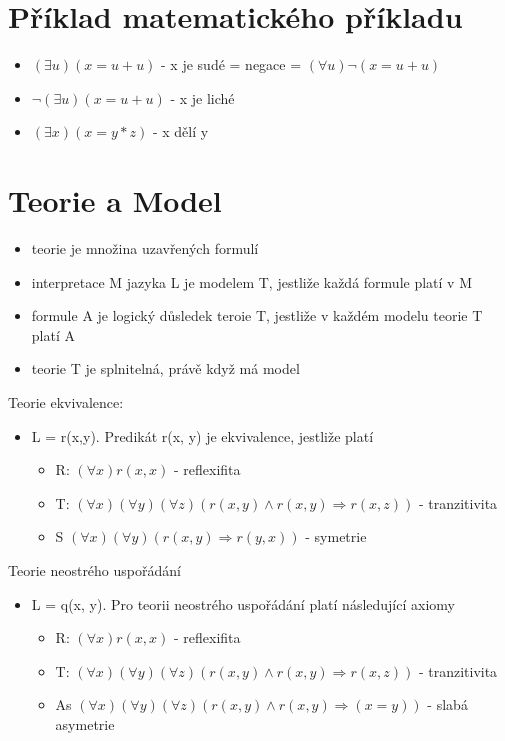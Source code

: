 \documentclass{szzclass}
\begin{document}
\section{Příklad matematického příkladu}
\begin{itemize}
  \item $(\exists{u})(x = u + u)$ - x je sudé = negace = $(\forall{u})\neg(x = u + u)$
  \item $\neg(\exists{u})(x = u + u)$ - x je liché
  \item $(\exists{x})(x = y*z)$ - x dělí y
\end{itemize}
\section{Teorie a Model}
\begin{itemize}
  \item teorie je množina uzavřených formulí
  \item interpretace M jazyka L je modelem T, jestliže každá formule platí v M
  \item formule A je logický důsledek teroie T, jestliže v každém modelu teorie T platí A
  \item teorie T je splnitelná, právě když má model
\end{itemize}
Teorie ekvivalence:
\begin{itemize}
  \item L = {r(x,y)}. Predikát r(x, y) je ekvivalence, jestliže platí
  \begin{itemize}
    \item R: $(\forall{x}) r(x,x)$ - reflexifita
    \item T: $(\forall{x})(\forall{y})(\forall{z})(r(x,y) \wedge r(x,y) \Rightarrow r(x,z))$ - tranzitivita
    \item S $(\forall{x})(\forall{y})(r(x,y) \Rightarrow r(y,x))$ - symetrie
  \end{itemize}
\end{itemize}
Teorie neostrého uspořádání
\begin{itemize}
  \item L = {q(x, y)}. Pro teorii neostrého uspořádání platí následující axiomy
  \begin{itemize}
    \item R: $(\forall{x}) r(x,x)$ - reflexifita
    \item T: $(\forall{x})(\forall{y})(\forall{z})(r(x,y) \wedge r(x,y) \Rightarrow r(x,z))$ - tranzitivita
    \item As $(\forall{x})(\forall{y})(\forall{z})(r(x,y) \wedge r(x,y) \Rightarrow (x = y))$ - slabá asymetrie
  \end{itemize}
\end{itemize}
\end{document}
